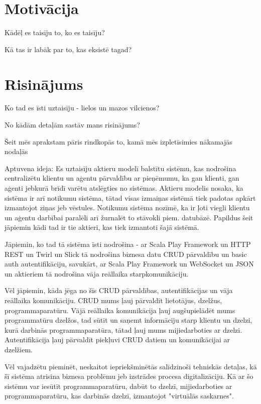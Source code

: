 \section{Motivācija}
Kādēļ es taisīju to, ko es taisīju?  

Kā tas ir labāk par to, kas eksistē tagad?  

\section{Risinājums}

Ko tad es īsti uztaisīju - lielos un mazos vilcienos?
  
No kādām detaļām sastāv mans risinājums?

Šeit mēs aprakstam pāris rindkopās to, kamā mēs izpletīsimies nākamajās nodaļās

Aptuvena ideja: Es uztaisīju aktieru modelī balstītu sistēmu, kas nodrošina centralizētu klientu un aģentu pārvaldību
ar pieņēmumu, ka gan klienti, gan aģenti jebkurā brīdī varētu atslēgties no sistēmas. Aktieru modelis nosaka, ka sistēma
ir arī notikumu sistēma, tātad visas izmaiņas sistēmā tiek padotas apkārt izmantojot ziņas jeb vēstules. Notikumu sistēma
nozīmē, ka ir ļoti viegli klientu un aģentu darbībai paralēli arī žurnalēt to stāvokli piem. datubāzē. Papildus šeit jāpiemin
kādi tad ir tie aktieri, kas tiek izmantoti šajā sistēmā. 

Jāpiemin, ko tad tā sistēma īsti nodrošina - ar Scala Play Framework un HTTP REST un Twirl un Slick tā nodrošina biznesa datu CRUD pārvaldību un
basic auth autentifikāciju, savukārt, ar Scala Play Framework un WebSocket un JSON un aktieriem tā nodrošina vāja reāllaika starpkomunikāciju.  

Vēl jāpiemin, kāda jēga no šīs CRUD pārvaldības, autentifikācijas un vāja reāllaika komunikāciju. CRUD mums ļauj pārvaldīt lietotājus, dzelžus,
programmaparatūru. Vājā reāllaika komunikācija ļauj augšupielādēt mums programmatūru dzelžos, tad sūtīt un saņemt informāciju starp klientu un dzelzi, 
kurā darbinās programmaparatūra, tātad ļauj mums mijiedarboties ar dzelzi. Autentifikācija ļauj pārvaldīt piekļuvi CRUD datiem un
komunikācijai ar dzelžiem.

Vēl vajadzētu pieminēt, neskaitot iepriekšminētās salīdzinoši tehniskās detaļas, kā šī sistēma atrisina biznesa problēmu jeb izstrādes procesa
digitalizāciju. Kā ar šo sistēmu var iesūtīt programmaparatūru, dabūt to dzelzī, mijiedarboties ar programmaparatūru, kas darbinās dzelzī, izmantojot
"virtuālās saskarnes".  

